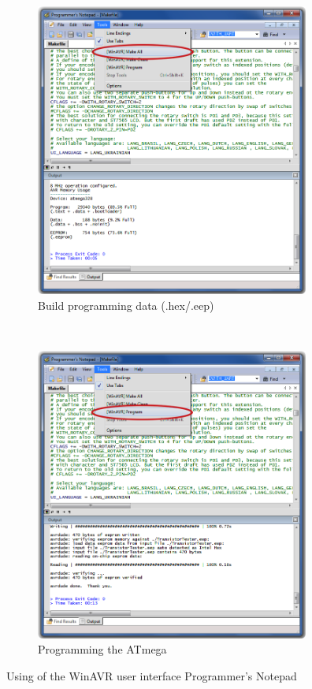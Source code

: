 \begin{figure}[H]
  \begin{subfigure}[b]{9cm}
    \centering
    \includegraphics[width=9cm]{../PNG/Notepad_make.png}
    \caption{Build programming data (.hex/.eep)}
  \end{subfigure}
  ~
  \begin{subfigure}[b]{9cm}
    \centering
    \includegraphics[width=9cm]{../PNG/Notepad_program.png}
    \caption{Programming the ATmega}
  \end{subfigure}
  \caption{Using of the WinAVR user interface Programmer's Notepad}
  \label{fig:WinAVR2}
\end{figure}



